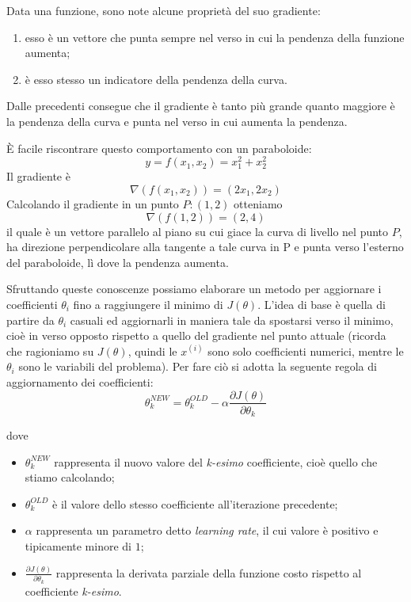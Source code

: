 Data una funzione, sono note alcune proprietà del suo gradiente:
\begin{enumerate}
  \item esso è un vettore che punta sempre nel verso in cui la pendenza della funzione aumenta;
  \item è esso stesso un indicatore della pendenza della curva.
\end{enumerate}
Dalle precedenti consegue che il gradiente è tanto più grande quanto maggiore è la pendenza della curva e punta nel verso in cui aumenta la pendenza.

\begin{esempio}
È facile riscontrare questo comportamento con un paraboloide:
\begin{equation*}
  y = f(x_1,x_2) = x_1^2 + x_2^2
\end{equation*}
Il gradiente è
\begin{equation*}
  \nabla(f(x_1,x_2))=(2x_1, 2x_2)
\end{equation*}
Calcolando il gradiente in un punto $P:(1,2)$ otteniamo
\begin{equation*}
  \nabla(f(1,2))=(2, 4)
\end{equation*}
il quale è un vettore parallelo  al piano su cui giace la curva di livello nel punto $P$, ha direzione perpendicolare alla tangente a tale curva in P e punta verso l'esterno del paraboloide, lì dove la pendenza aumenta.
\end{esempio}

Sfruttando queste conoscenze possiamo elaborare un metodo per aggiornare i coefficienti $\theta_i$ fino a raggiungere il minimo di $J(\theta)$. L'idea di base è quella di partire da $\theta_i$ casuali ed aggiornarli in maniera tale da spostarsi verso il minimo, cioè in verso opposto rispetto a quello del gradiente nel punto attuale (ricorda che ragioniamo su $J(\theta)$, quindi le $x^{(i)}$ sono solo coefficienti numerici, mentre le $\theta_i$ sono le variabili del problema). Per fare ciò si adotta la seguente regola di aggiornamento dei coefficienti:
\begin{equation*}
  \theta_k^{NEW} = \theta_k^{OLD} - \alpha \frac{ \partial J(\theta)}{ \partial \theta_k}
\end{equation*}

dove
\begin{itemize}
  \item $\theta_k^{NEW}$ rappresenta il nuovo valore del \emph{k-esimo} coefficiente, cioè quello che stiamo calcolando;
  \item $\theta_k^{OLD}$ è il valore dello stesso coefficiente all'iterazione precedente;
  \item $\alpha$ rappresenta un parametro detto \emph{learning rate}, il cui valore è positivo e tipicamente minore di $1$;
  \item $\frac{ \partial J(\theta)}{ \partial \theta_k}$ rappresenta la derivata parziale  della funzione costo rispetto al coefficiente \emph{k-esimo}.
\end{itemize}

